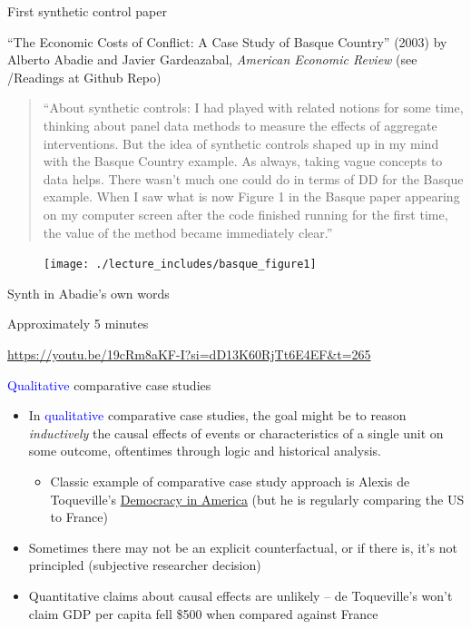 \documentclass{beamer}
\begin{document}
\begin{frame}{First synthetic control paper}

 
``The Economic Costs of Conflict: A Case Study of Basque Country'' (2003) by Alberto Abadie and Javier Gardeazabal, \emph{American Economic Review} (see /Readings at Github Repo)

\bigskip
\footnotesize
\begin{quote} ``About synthetic controls: I had played with related notions for some time, thinking about panel data methods to measure the effects of aggregate interventions. But the idea of synthetic controls shaped up in my mind with the Basque Country example. As always, taking vague concepts to data helps. There wasn’t much one could do in terms of DD for the Basque example. When I saw what is now Figure 1 in the Basque paper appearing on my computer screen after the code finished running for the first time, the value of the method became immediately clear.''
\end{quote}


\end{frame}


\begin{frame}{}

\begin{figure}
\texttt{[image: ./lecture\_includes/basque\_figure1]}
\end{figure}

\end{frame}

\begin{frame}{Synth in Abadie's own words}

Approximately 5 minutes

\url{https://youtu.be/19cRm8aKF-I?si=dD13K60RjTt6E4EF&t=265}

\end{frame}



\begin{frame}{\textcolor{blue}{Qualitative} comparative case studies}
	
	\begin{itemize}
	\item In \textcolor{blue}{qualitative} comparative case studies, the goal might be to reason \emph{inductively} the causal effects of events or characteristics of a single unit on some outcome, oftentimes through logic and historical analysis.  
		\begin{itemize}
		\item Classic example of comparative case study approach is Alexis de Toqueville's \underline{Democracy in America} (but he is regularly comparing the US to France)
		\end{itemize}
	\item Sometimes there may not be an explicit counterfactual, or if there is, it's not principled (subjective researcher decision)
	\item Quantitative claims about causal effects are unlikely -- de Toqueville's won't claim GDP per capita fell \$500 when compared against France
	\end{itemize}
\end{frame}
\end{document}
